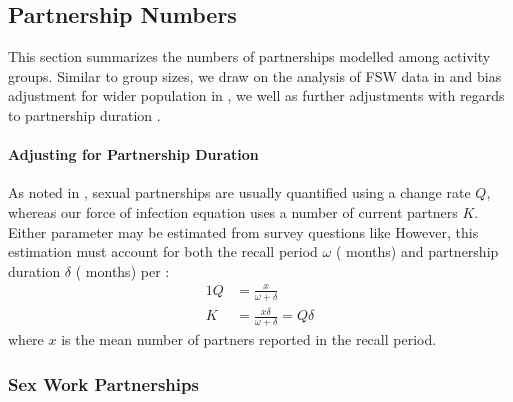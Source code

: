 \subsection{Partnership Numbers}\label{mod.par.pnum}
This section summarizes the numbers of partnerships modelled among activity groups.
Similar to group sizes, we draw on the
analysis of FSW data in  and
bias adjustment for wider population in ,
we well as further adjustments with regards to partnership duration \cite{Knight2023bias}.
\paragraph{Adjusting for Partnership Duration}
As noted in ,
sexual partnerships are usually quantified using a change rate $Q$,
whereas our force of infection equation uses a number of current partners $K$.
Either parameter may be estimated from survey questions like
However, this estimation must account for both the
recall period $\omega$ ( months) and
partnership duration $\delta$ ( months) per \cite{Knight2023bias}:
\begin{alignat}{1}
  Q &= \frac{x}{\omega+\delta} \label{eq:x2Q}\\
  K &= \frac{x\delta}{\omega+\delta} = Q\delta \label{eq:x2K}
\end{alignat}
where $x$ is the mean number of partners reported in the recall period.
\subsubsection{Sex Work Partnerships}\label{mod.par.pnum.swx}
